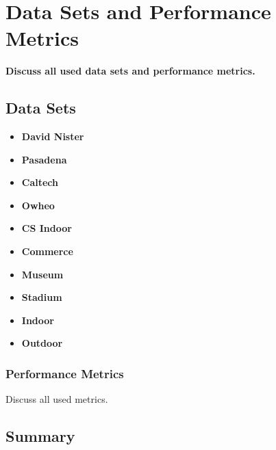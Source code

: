 \chapter{Data Sets and Performance Metrics}
\label{chap:datasets}

\textbf{Discuss all used data sets and 
performance metrics.}


\section{Data Sets}
\begin{itemize}
\item \textbf{David Nister}
\item \textbf{Pasadena}
\item \textbf{Caltech}
\item \textbf{Owheo}
\item \textbf{CS Indoor}
\item \textbf{Commerce}
\item \textbf{Museum}
\item \textbf{Stadium}
\item \textbf{Indoor}
\item \textbf{Outdoor}
\end{itemize}

\subsection{Performance Metrics}
Discuss all used metrics.

\section{Summary}
